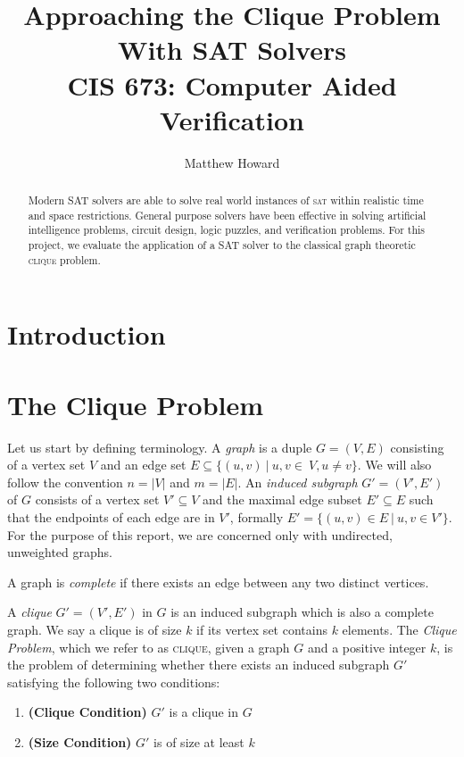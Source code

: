 \documentclass[]{article}
\title{Approaching the Clique Problem\\ With SAT Solvers\\[.2cm]
	\large{CIS 673: Computer Aided Verification}}
\author{Matthew Howard}
\newcommand{\clique}{\textsc{clique}}
\begin{document}
	
	\maketitle
	
	\begin{abstract}
		Modern SAT solvers are able to solve real world instances of \textsc{sat} within realistic time and space restrictions. General purpose solvers have been effective in solving artificial intelligence problems, circuit design, logic puzzles, and verification problems. For this project, we evaluate the application of a SAT solver to the classical graph theoretic \clique{} problem.
	\end{abstract}
	
	\section{Introduction}
	
	
	\section{The Clique Problem}
	
	Let us start by defining terminology. A \textit{graph} is a duple $G = (V, E)$ consisting of a vertex set $V$ and an edge set $E \subseteq \{(u, v) ~\vert~ u, v \in~V, u \neq v\}$. We will also follow the convention $n = |V|$ and $m = |E|$. An \textit{induced subgraph} $G' = (V', E')$ of $G$ consists of a vertex set $V' \subseteq V$ and the maximal edge subset $E' \subseteq E$ such that the endpoints of each edge are in $V'$, formally $E' = \{(u, v) \in E ~\vert~ u, v \in V'\}$. For the purpose of this report, we are concerned only with undirected, unweighted graphs.
	
	A graph is \textit{complete} if there exists an edge between any two distinct vertices.
	
	A \textit{clique} $G' = (V', E')$ in $G$ is an induced subgraph which is also a complete graph. We say a clique is of size $k$ if its vertex set contains $k$ elements. The \textit{Clique Problem}, which we refer to as \clique{}, given a graph $G$ and a positive integer $k$, is the problem of determining whether there exists an induced subgraph $G'$ satisfying the following two conditions:
	\begin{enumerate}
		\item \textbf{(Clique Condition)} $G'$ is a clique in $G$
		\item \textbf{(Size Condition)} $G'$ is of size at least $k$
	\end{enumerate}	
	
\end{document}
